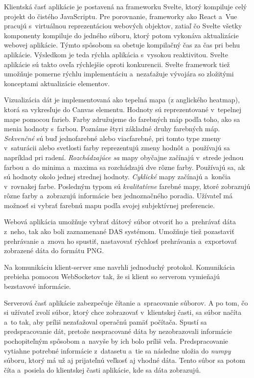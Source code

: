 Klientská časť aplikácie je postavená na frameworku Svelte, ktorý kompiluje celý projekt do čistého JavaScriptu. Pre porovnanie, frameworky ako React a~Vue pracujú s~virtuálnou reprezentáciou webových objektov, zatiaľ čo Svelte všetky komponenty kompiluje do jedného súboru, ktorý potom vykonáva aktualizácie webovej aplikácie. Týmto spôsobom sa obetuje kompilačný čas za čas pri behu aplikácie. Výsledkom je teda rýchla aplikácia s~vysokou reaktivitou. Svelte aplikácie sú takto oveľa rýchlejšie oproti konkurencii. Svelte framework tiež umožňuje pomerne rýchlu implementáciu a~nezaťažuje vývojára so zložitými konceptami aktualizácie elementov.

Vizualizácia dát je implementovaná ako tepelná mapa (z anglického heatmap), ktorá sa vykresľuje do Canvas elementu. Hodnoty sú reprezentované v~tepelnej mape pomocou farieb. Farby združujeme do farebných máp podľa toho, ako sa menia hodnoty s~farbou. Poznáme štyri základné druhy farebných máp. \textit{Sekvenčné} sú buď jednofarebné alebo viacfarebné, pri tomto type zmeny v~saturácii alebo svetlosti farby reprezentujú zmeny hodnôt a~používajú sa napríklad pri radení. \textit{Rozchádzajúce sa} mapy obyčajne začínajú v~strede jednou farbou a~do minima a~maxima sa rozchádzajú dve rôzne farby. Používajú sa, ak sú hodnoty okolo jednej strednej hodnoty. \textit{Cyklické} mapy začínajú a~končia v~rovnakej farbe. Posledným typom sú \textit{kvalitatívne} farebné mapy, ktoré zobrazujú rôzne farby a~zobrazujú informácie bez jednoznačného poradia. Užívateľ má možnosť si vybrať farebnú mapu podľa svojej subjektívnej preferencie.

Webová aplikácia umožňuje vybrať dátový súbor otvoriť ho a~prehrávať dáta z~neho, tak ako boli zaznamenané DAS systémom. Umožňuje tiež pozastaviť prehrávanie a~znova ho spustiť, nastavovať rýchlosť prehrávania a~exportovať zobrazené dáta do formátu PNG. 

Na komunikáciu klient-server sme navrhli jednoduchý protokol. Komunikácia prebieha pomocou WebSocketov tak, že si klient so serverom vymieňajú bezstavové informácie. 

Serverová časť aplikácie zabezpečuje čítanie a~spracovanie súborov. A po tom, čo si užívateľ zvolí súbor, ktorý chce zobrazovať v~klientskej časti, sa súbor načíta a~to tak, aby príliš nezaťažoval operačnú pamäť počítača. Spustí sa predspracovanie dát, pretože nespracované dáta by nezobrazovali informácie pochopiteľným spôsobom a~navyše by ich bolo príliš veľa. Predspracovanie vytiahne potrebné informácie z~datasetu a~tie sa následne uložia do \textit{numpy} súboru, ktorý má už aj prijateľnú veľkosť aj vhodné dáta. Tento súbor sa potom číta a~posiela do klientskej časti aplikácie, kde sa dáta zobrazujú. 

